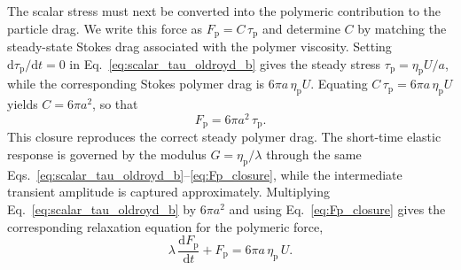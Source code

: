 \documentclass{elsarticle}
\begin{document}
The scalar stress must next be converted into the polymeric contribution
to the particle drag. We write this force as
$F_{\mathrm{p}}=C\,\tau_{\mathrm{p}}$ and determine $C$ by matching the
steady-state Stokes drag associated with the polymer viscosity. Setting
$\mathrm{d}\tau_{\mathrm{p}}/\mathrm{d}t=0$ in
Eq.~\eqref{eq:scalar_tau_oldroyd_b} gives the steady stress
$\tau_{\mathrm{p}}=\eta_{\mathrm{p}}U/a$, while the corresponding Stokes
polymer drag is $6\pi a\,\eta_{\mathrm{p}}U$. Equating
$C\,\tau_{\mathrm{p}}=6\pi a\,\eta_{\mathrm{p}}U$ yields $C=6\pi a^{2}$,
so that
\begin{equation}
F_{\mathrm{p}} = 6\pi a^{2}\,\tau_{\mathrm{p}}.
\label{eq:Fp_closure}
\end{equation}
This closure reproduces the correct steady polymer drag. The short-time
elastic response is governed by the modulus
$G=\eta_{\mathrm{p}}/\lambda$ through the same
Eqs.~\eqref{eq:scalar_tau_oldroyd_b}--\eqref{eq:Fp_closure}, while the
intermediate transient amplitude is captured approximately. Multiplying
Eq.~\eqref{eq:scalar_tau_oldroyd_b} by $6\pi a^{2}$ and using
Eq.~\eqref{eq:Fp_closure} gives the corresponding relaxation equation
for the polymeric force,
\begin{equation}
\lambda\,\dfrac{\mathrm{d}F_{\mathrm{p}}}{\mathrm{d}t} + F_{\mathrm{p}}
= 6\pi a\,\eta_{\mathrm{p}}\,U.
\label{eq:Fp_relax}
\end{equation}
\end{document}
